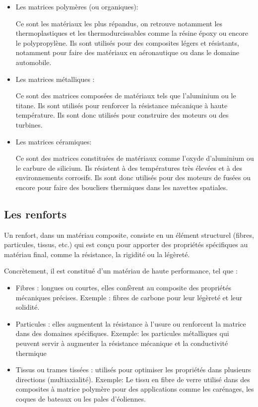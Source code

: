 \begin{itemize}

    \item
    Les matrices polymères (ou organiques):


    Ce sont les matériaux les plus répandus, on retrouve notamment les thermoplastiques et les thermodurcissables comme la résine époxy ou encore le polypropylène. Ils sont utilisés pour des composites légers et résistants, notamment pour faire des matériaux en aéronautique ou dans le domaine automobile.




    \item
    Les matrices métalliques :


    Ce sont des matrices composées de matériaux tels que l’aluminium ou le titane. Ils sont utilisés pour renforcer la résistance mécanique à haute température. Ils sont donc utilisés pour construire des moteurs ou des turbines.




    \item
    Les matrices céramiques:


    Ce sont des matrices constituées de matériaux comme l'oxyde d'aluminium ou le carbure de silicium. Ils résistent à des températures très élevées et à des environnements corrosifs. Ils sont donc utilisés pour des moteurs de fusées ou encore pour faire des boucliers thermiques dans les navettes spatiales.


\end{itemize}

\subsection{Les renforts}


Un renfort, dans un matériau composite, consiste en un élément structurel (fibres, particules, tissus, etc.) qui est conçu pour apporter des propriétés spécifiques au matériau final, comme la résistance, la rigidité ou la légèreté.


Concrètement, il est constitué d'un matériau de haute performance, tel que :


\begin{itemize}

    \item Fibres : longues ou courtes, elles confèrent au composite des propriétés mécaniques précises. Exemple : fibres de carbone pour leur légèreté et leur solidité.

    \item Particules : elles augmentent la résistance à l'usure ou renforcent la matrice dans des domaines spécifiques. Exemple: les particules métalliques qui peuvent servir à augmenter la résistance mécanique et la conductivité thermique

    \item Tissus ou trames tissées : utilisés pour optimiser les propriétés dans plusieurs directions (multiaxialité). Exemple: Le tissu en fibre de verre utilisé dans des composites à matrice polymère pour des applications comme les carénages, les coques de bateaux ou les pales d'éoliennes.

\end{itemize}


